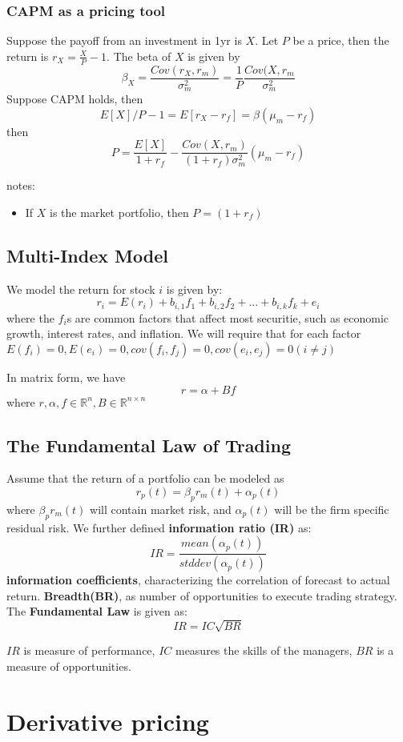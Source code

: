 \documentclass[a4paper,13pt]{report}
\begin{document}
\subsection{CAPM as a pricing tool}
Suppose the payoff from an investment in 1yr is $X$. Let $P$ be a price, then the return is $r_X = \frac{X}{P}-1$. The beta of $X$ is given by 
$$\beta_X = \frac{Cov(r_X,r_m)}{\sigma_m^2} = \frac{1}{P}\frac{Cov(X,r_m}{\sigma_m^2}$$
Suppose CAPM holds, then
$$E[X]/P - 1 = E[r_X - r_f] = \beta (\mu_m - r_f)$$
then
$$P = \frac{E[X]}{1+r_f} -\frac{Cov(X,r_m)}{(1+r_f)\sigma_m^2}(\mu_m - r_f) $$

notes:
\begin{itemize}
    \item If $X$ is the market portfolio, then $P=(1+r_f)$
\end{itemize}

\section{Multi-Index Model}
We model the return for stock $i$ is given by:
$$r_i = E(r_i) + b_{i,1}f_1 + b_{i,2}f_2 + ... + b_{i,k}f_k + e_i$$
where the $f_i$s are common factors that affect most securitie, such as economic growth, interest rates, and inflation. We will require that for each factor $E(f_i) = 0, E(e_i) = 0, cov(f_i,f_j) = 0, cov(e_i,e_j) = 0 (i \neq j)$

In matrix form, we have
$$r = \alpha + Bf$$
where $r,\alpha,f \in \mathbb{R}^n, B\in \mathbb{R}^{n\times n}$

\section{The Fundamental Law of Trading}
Assume that the return of a portfolio can be modeled as
$$r_p(t) = \beta_p r_m(t) + \alpha_p(t) $$where $\beta_p r_m(t)$ will contain market risk, and $\alpha_p(t)$ will be the firm specific residual risk. 
We further defined \textbf{information ratio (IR)} as: 
$$IR = \frac{mean(\alpha_p(t))}{stddev(\alpha_p(t))}$$
\textbf{information coefficients}, characterizing the correlation of forecast to actual return.
\textbf{Breadth(BR)}, as number of opportunities to execute trading strategy. 
The \textbf{Fundamental Law} is given as:
$$IR = IC \sqrt{BR}$$

$IR$ is measure of performance, $IC$ measures the skills of the managers, $BR$ is a measure of opportunities.


\chapter{Derivative pricing}
\end{document}
